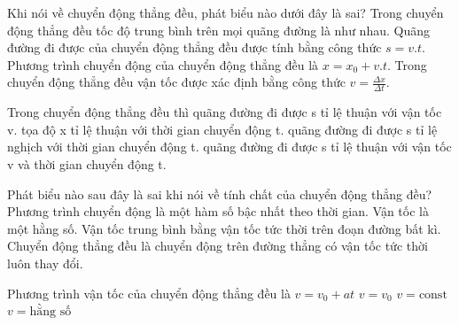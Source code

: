 \begin{ex}
Khi nói về chuyển động thẳng đều, phát biểu nào dưới đây là sai?
\choice
{Trong chuyển động thẳng đều tốc độ trung bình trên mọi quãng đường là như nhau.}
{Quãng đường đi được của chuyển động thẳng đều được tính bằng công thức $s = v.t$.}
{Phương trình chuyển động của chuyển động thẳng đều là $x = x_0 + v.t$.}
{\True Trong chuyển động thẳng đều vận tốc được xác định bằng công thức $v = \frac{\Delta x}{\Delta t}$.}
\end{ex}

\begin{ex}
Trong chuyển động thẳng đều thì
\choice
{quãng đường đi được s tỉ lệ thuận với vận tốc v.}
{tọa độ x tỉ lệ thuận với thời gian chuyển động t.}
{quãng đường đi được s tỉ lệ nghịch với thời gian chuyển động t.}
{\True quãng đường đi được s tỉ lệ thuận với vận tốc v và thời gian chuyển động t.}
\end{ex}

\begin{ex}
Phát biểu nào sau đây là sai khi nói về tính chất của chuyển động thẳng đều?
\choice
{Phương trình chuyển động là một hàm số bậc nhất theo thời gian.}
{Vận tốc là một hằng số.}
{Vận tốc trung bình bằng vận tốc tức thời trên đoạn đường bất kì.}
{\True Chuyển động thẳng đều là chuyển động trên đường thẳng có vận tốc tức thời luôn thay đổi.}
\end{ex}

\begin{ex}
Phương trình vận tốc của chuyển động thẳng đều là
\choice
{$v = v_0 + at$}
{$v = v_0$}
{$v = \text{const}$}
{\True $v = \text{hằng số}$}
\end{ex}

